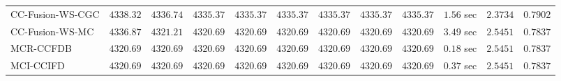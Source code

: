 \begin{table}[H]
\begin{tabular}{lrrrrrrrrrrr}
    CC-Fusion-WS-CGC & $      4338.32$ & $      4336.74$ & $      4335.37$ & $      4335.37$ & $      4335.37$ & $      4335.37$ & $      4335.37$ & $      4335.37$ & $         1.56$ sec    & $       2.3734$  & $       0.7902$ \\ 
     CC-Fusion-WS-MC & $      4336.87$ & $      4321.21$ & $      4320.69$ & $      4320.69$ & $      4320.69$ & $      4320.69$ & $      4320.69$ & $      4320.69$ & $         3.49$ sec    & $       2.5451$  & $       0.7837$ \\ 
\cmidrule{1-1} 
           MCR-CCFDB & $      4320.69$ & $      4320.69$ & $      4320.69$ & $      4320.69$ & $      4320.69$ & $      4320.69$ & $      4320.69$ & $      4320.69$ & $         0.18$ sec    & $       2.5451$  & $       0.7837$ \\ 
\cmidrule{1-1} 
           MCI-CCIFD & $      4320.69$ & $      4320.69$ & $      4320.69$ & $      4320.69$ & $      4320.69$ & $      4320.69$ & $      4320.69$ & $      4320.69$ & $         0.37$ sec    & $       2.5451$  & $       0.7837$ \\ 
\bottomrule
\end{tabular}
\end{table}


